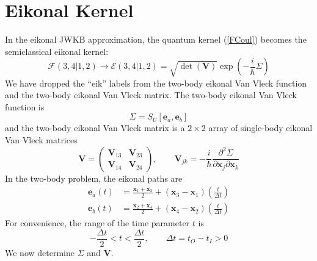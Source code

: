 \section{Eikonal Kernel}
In the eikonal JWKB approximation, the quantum kernel (\ref{FCoul}) becomes the semiclassical eikonal kernel:
\begin{equation}
	\mathcal{F}(3,4|1,2) \longrightarrow \mathcal{E}(3,4|1,2) = \sqrt{\det{(\mathbf{V})}} \exp{\left( - \frac{i}{\hbar} \Sigma \right)}
\end{equation}
We have dropped the ``eik'' labels from the two-body eikonal Van Vleck function and the two-body eikonal Van Vleck matrix. The two-body eikonal Van Vleck function is
\begin{equation}
	\Sigma = S_{U}[ \mathbf{e}_{a}, \mathbf{e}_{b} ]
\end{equation}
and the two-body eikonal Van Vleck matrix is a $2 \times 2$ array of single-body eikonal Van Vleck matrices
\begin{equation}
	\mathbf{V} = \begin{pmatrix}
	\mathbf{V}_{13} & \mathbf{V}_{23} \\
	\mathbf{V}_{14} & \mathbf{V}_{24}
	\end{pmatrix}, \qquad \mathbf{V}_{jk} = - \frac{i}{\hbar} \frac{\partial^{2} \Sigma}{\partial \mathbf{x}_{j} \partial \mathbf{x}_{k}}
\end{equation}
In the two-body problem, the eikonal paths are
\begin{equation}
\begin{split}
	\mathbf{e}_{a}(t) &= \frac{\mathbf{x}_{1} + \mathbf{x}_{3}}{2} + \left( \mathbf{x}_{3} - \mathbf{x}_{1} \right) \left( \frac{t}{\Delta t} \right) \\
	\mathbf{e}_{b}(t) &= \frac{\mathbf{x}_{2} + \mathbf{x}_{4}}{2} + \left( \mathbf{x}_{4} - \mathbf{x}_{2} \right) \left( \frac{t}{\Delta t} \right)
\end{split} \label{NReikPath}
\end{equation}
For convenience, the range of the time parameter $t$ is
\begin{equation}
	{ -\frac{\Delta t}{2} } < t < \frac{\Delta t}{2}, \qquad \Delta t = t_{O} - t_{I} > 0
\end{equation}
We now determine $\Sigma$ and $\mathbf{V}$.
